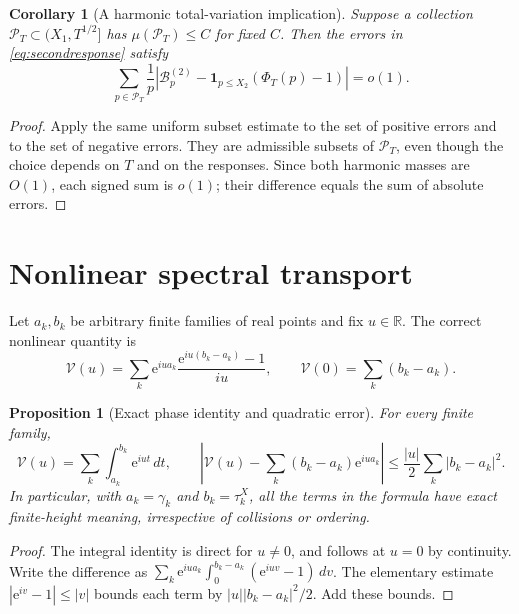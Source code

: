 \documentclass[11pt,reqno]{amsart}
\numberwithin{equation}{section}
\newtheorem{proposition}[theorem]{Proposition}
\newtheorem{corollary}[theorem]{Corollary}
\newcommand{\R}{\mathbb R}
\newcommand{\e}{\mathrm e}
\begin{document}
\begin{corollary}[A harmonic total-variation implication]
\label{cor:variation}
Suppose a collection $\mathscr P_T\subset(X_1,T^{1/2}]$
has $\mu(\mathscr P_T)\le C$ for fixed $C$.
Then the errors in \eqref{eq:secondresponse} satisfy
\begin{equation}\label{eq:variation}
\sum_{p\in\mathscr P_T}\frac{1}{p}
\left|\mathcal B_p^{(2)}
 -\mathbf1_{p\le X_2}(\Phi_T(p)-1)\right|=o(1).
\end{equation}
\end{corollary}
\begin{proof}
Apply the same uniform subset estimate to the set of positive
errors and to the set of negative errors.  They are admissible
subsets of $\mathscr P_T$, even though the choice depends on
$T$ and on the responses.  Since both harmonic masses are
$O(1)$, each signed sum is $o(1)$; their difference equals the
sum of absolute errors.
\end{proof}



\section{Nonlinear spectral transport}\label{sec:spectral}
Let $a_k,b_k$ be arbitrary finite families of real points and fix $u\in\R$. The correct nonlinear quantity is
\begin{equation}\label{eq:nonlinear}
\mathcal V(u)=\sum_k\e^{iua_k}\frac{\e^{iu(b_k-a_k)}-1}{iu},
\qquad \mathcal V(0)=\sum_k(b_k-a_k).
\end{equation}
\begin{proposition}[Exact phase identity and quadratic error]\label{prop:nonlinear}
For every finite family,
\begin{equation}\label{eq:nonlinearexact}
\mathcal V(u)=\sum_k\int_{a_k}^{b_k}\e^{iut}\,dt,
\qquad
\left|\mathcal V(u)-\sum_k(b_k-a_k)\e^{iua_k}\right|
\le\frac{|u|}{2}\sum_k|b_k-a_k|^2.
\end{equation}
In particular, with $a_k=\gamma_k$ and $b_k=\tau_k^X$, all the terms in the formula have exact finite-height meaning, irrespective of collisions or ordering.
\end{proposition}
\begin{proof}
The integral identity is direct for $u\ne0$, and follows at $u=0$ by continuity. Write the difference as
$\sum_k\e^{iua_k}\int_0^{b_k-a_k}(\e^{iuv}-1)\,dv$. The elementary estimate $|\e^{iv}-1|\le|v|$ bounds each term by $|u||b_k-a_k|^2/2$. Add these bounds.
\end{proof}
\end{document}
